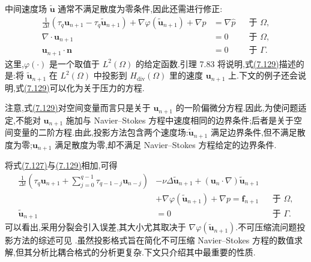 \begin{note}[动机与基本思想]
中间速度场 $\widetilde{\bm{u}}$ 通常不满足散度为零条件,因此还需进行修正:
\begin{equation}\label{eq:projection-correction-step}
\begin{aligned}
 \frac1{\Delta t}\left(
   \tau_q\bm{u}_{n+1}-\tau_q\widetilde{\bm{u}}_{n+1}\right)
   +\nabla\varphi(\widetilde{\bm{u}}_{n+1})
   +\nabla p&=\nabla\widehat p
     &&\text{于 }\Omega,\\
 \nabla\cdot\bm{u}_{n+1}&=0
     &&\text{于 }\Omega,\\
 \bm{u}_{n+1}\cdot\bm{n}&=0
     &&\text{于 }\Gamma.
\end{aligned}
\end{equation}
这里,$\varphi(\cdot)$ 是一个取值于 $L^2(\Omega)$ 的给定函数.引理 7.83 将说明,式\hyperref[eq:projection-correction-step]{(7.129)}描述的是:将 $\widetilde{\bm{u}}_{n+1}$ 在 $L^2(\Omega)$ 中投影到 $H_{\mathrm{div}}(\Omega)$ 里的速度 $\bm{u}_{n+1}$ 上.下文的例子还会说明,式\hyperref[eq:projection-correction-step]{(7.129)}可以化为关于压力的方程.

注意,式\hyperref[eq:projection-correction-step]{(7.129)}对空间变量而言只是关于 $\bm{u}_{n+1}$ 的一阶偏微分方程.因此,为使问题适定,不能对 $\bm{u}_{n+1}$ 施加与 Navier--Stokes 方程中速度相同的边界条件;后者是关于空间变量的二阶方程.由此,投影方法包含两个速度场:$\widetilde{\bm{u}}_{n+1}$ 满足边界条件,但不满足散度为零;$\bm{u}_{n+1}$ 满足散度为零,却不满足 Navier--Stokes 方程给定的边界条件.

将式\hyperref[eq:projection-intermediate-velocity]{(7.127)}与\hyperref[eq:projection-correction-step]{(7.129)}相加,可得
\[
\begin{aligned}
 \frac1{\Delta t}\left(
   \tau_q\bm{u}_{n+1}
   +\sum_{j=0}^{q-1}\tau_{q-1-j}\bm{u}_{n-j}\right)
 &-\nu\Delta\widetilde{\bm{u}}_{n+1}
   +(\bm{u}_n\cdot\nabla)\widetilde{\bm{u}}_{n+1}\\
 &+\nabla\varphi(\widetilde{\bm{u}}_{n+1})+\nabla p
   =\bm{f}_{n+1}
     &&\text{于 }\Omega,\\
 \widetilde{\bm{u}}_{n+1}&=0
     &&\text{于 }\Gamma.
\end{aligned}
\]
可以看出,采用分裂会引入误差,其大小尤其取决于
$\nabla\varphi(\widetilde{\bm{u}}_{n+1})$.不可压缩流问题投影方法的综述可见 \textcite{Guermond2006}.虽然投影格式旨在简化不可压缩 Navier--Stokes 方程的数值求解,但其分析比耦合格式的分析更复杂.下文只介绍其中最重要的性质.
\end{note}

